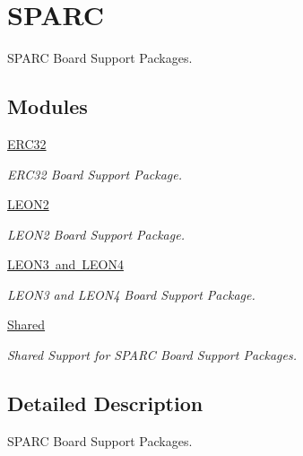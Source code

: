 \hypertarget{group__RTEMSBSPsSPARC}{}\section{S\+P\+A\+RC}
\label{group__RTEMSBSPsSPARC}


S\+P\+A\+RC Board Support Packages.  


\subsection*{Modules}
\begin{DoxyCompactItemize}
\item 
\mbox{\hyperlink{group__RTEMSBSPsSPARCERC32}{E\+R\+C32}}
\begin{DoxyCompactList}\small\item\em E\+R\+C32 Board Support Package. \end{DoxyCompactList}\item 
\mbox{\hyperlink{group__RTEMSBSPsSPARCLEON2}{L\+E\+O\+N2}}
\begin{DoxyCompactList}\small\item\em L\+E\+O\+N2 Board Support Package. \end{DoxyCompactList}\item 
\mbox{\hyperlink{group__RTEMSBSPsSPARCLEON3}{L\+E\+O\+N3 and L\+E\+O\+N4}}
\begin{DoxyCompactList}\small\item\em L\+E\+O\+N3 and L\+E\+O\+N4 Board Support Package. \end{DoxyCompactList}\item 
\mbox{\hyperlink{group__RTEMSBSPsSPARCShared}{Shared}}
\begin{DoxyCompactList}\small\item\em Shared Support for S\+P\+A\+RC Board Support Packages. \end{DoxyCompactList}\end{DoxyCompactItemize}


\subsection{Detailed Description}
S\+P\+A\+RC Board Support Packages. 

